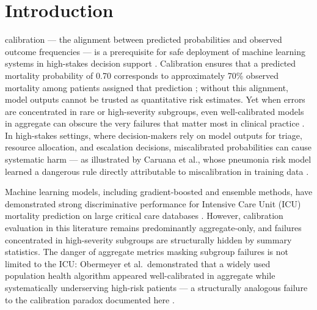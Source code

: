 \documentclass{ieeeaccess}
\begin{document}
\titlepgskip=-15pt

\maketitle

\section{Introduction}
\label{sec:introduction}

 calibration — the alignment between predicted probabilities and observed outcome frequencies — is a prerequisite for safe deployment of machine learning systems in high-stakes decision support \cite{b1}. Calibration ensures that a predicted mortality probability of 0.70 corresponds to approximately 70\% observed mortality among patients assigned that prediction \cite{b2}; without this alignment, model outputs cannot be trusted as quantitative risk estimates. Yet when errors are concentrated in rare or high-severity subgroups, even well-calibrated models in aggregate can obscure the very failures that matter most in clinical practice \cite{b1}. In high-stakes settings, where decision-makers rely on model outputs for triage, resource allocation, and escalation decisions, miscalibrated probabilities can cause systematic harm — as illustrated by Caruana et al., whose pneumonia risk model learned a dangerous rule directly attributable to miscalibration in training data \cite{b3}.

Machine learning models, including gradient-boosted and ensemble methods, have demonstrated strong discriminative performance for Intensive Care Unit (ICU) mortality prediction on large critical care databases \cite{b29,b31}. However, calibration evaluation in this literature remains predominantly aggregate-only, and failures concentrated in high-severity subgroups are structurally hidden by summary statistics. The danger of aggregate metrics masking subgroup failures is not limited to the ICU: Obermeyer et al.\ demonstrated that a widely used population health algorithm appeared well-calibrated in aggregate while systematically underserving high-risk patients — a structurally analogous failure to the calibration paradox documented here \cite{b28}.
\end{document}
